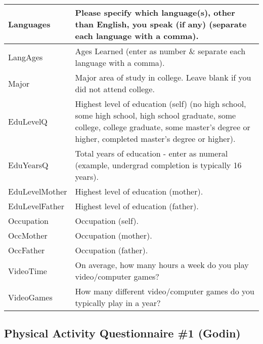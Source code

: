 \documentclass[letterpaper,10pt,english]{sphinxmanual}
\begin{document}
\begin{savenotes}
\begin{tabulary}{\linewidth}[t]{|T|T|}
Languages
&
Please specify which language(s), other than English, you speak (if any) (separate each language with a comma).
\\
\hline
LangAges
&
Ages Learned (enter as number \& separate each language with a comma).
\\
\hline
Major
&
Major area of study in college. Leave blank if you did not attend college.
\\
\hline
EduLevelQ
&
Highest level of education (self) (no high school, some high school, high school graduate, some college, college graduate, some master’s degree or higher, completed master’s degree or higher).
\\
\hline
EduYearsQ
&
Total years of education - enter as numeral (example, undergrad completion is typically 16 years).
\\
\hline
EduLevelMother
&
Highest level of education (mother).
\\
\hline
EduLevelFather
&
Highest level of education (father).
\\
\hline
Occupation
&
Occupation (self).
\\
\hline
OccMother
&
Occupation (mother).
\\
\hline
OccFather
&
Occupation (father).
\\
\hline
VideoTime
&
On average, how many hours a week do you play video/computer games?
\\
\hline
VideoGames
&
How many different video/computer games do you typically play in a year?
\\
\hline
\end{tabulary}
\par
\sphinxattableend\end{savenotes}


\subsection{Physical Activity Questionnaire \#1 (Godin)}
\label{\detokenize{Data_Definations_Phase1B:physical-activity-questionnaire-1-godin}}
\end{document}
